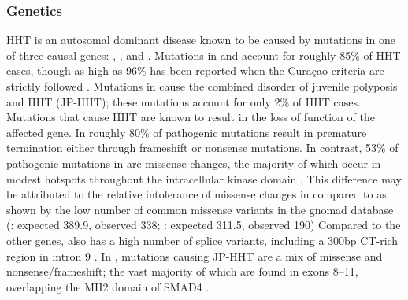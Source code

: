 \subsubsection{Genetics}
HHT is an autosomal dominant disease known to be caused by mutations in one of three causal genes:  \citep{mcallister1994},  \citep{johnson1996}, and  \citep{gallione2004}. Mutations in  and  account for roughly 85\% of HHT cases, though as high as 96\% has been reported when the Cura\c{c}ao criteria are strictly followed \citep{mcdonald2020}. Mutations in  cause the combined disorder of juvenile polyposis and HHT (JP-HHT); these mutations account for only 2\% of HHT cases. Mutations that cause HHT are known to result in the loss of function of the affected gene. In  roughly 80\% of pathogenic mutations result in premature termination either through frameshift or nonsense mutations. In contrast, 53\% of pathogenic mutations in  are missense changes, the majority of which occur in modest hotspots throughout the intracellular kinase domain \citep{abdalla2003}. This difference may be attributed to the relative intolerance of missense changes in  compared to  as shown by the low number of common missense variants in the gnomad database (: expected 389.9, observed 338; : expected 311.5, observed 190) Compared to the other genes,  also has a high number of splice variants, including a 300bp CT-rich region in intron 9 \citep{wooderchakdonahue2018}. In , mutations causing JP-HHT are a mix of missense and nonsense/frameshift; the vast majority of which are found in exons 8--11, overlapping the MH2 domain of SMAD4 \citep{gallione2004}.

